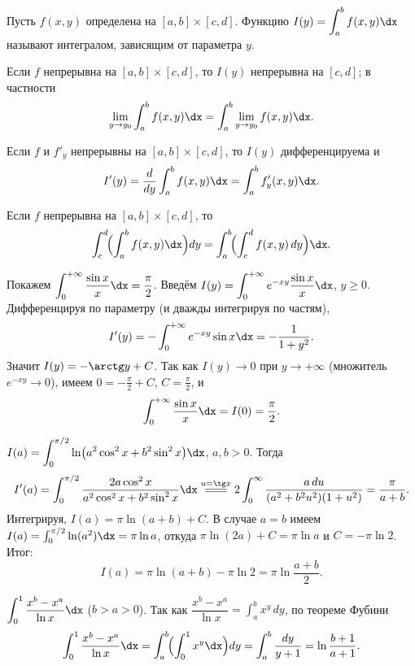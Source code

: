 \begin{definition}
Пусть $f(x,y)$ определена на $[a,b]\times[c,d]$. Функцию
$\displaystyle I(y)=\int_a^b f(x,y)\dx$ называют интегралом, зависящим от параметра $y$.
\end{definition}

\begin{theorem}[непрерывность]
Если $f$ непрерывна на $[a,b]\times[c,d]$, то $I(y)$ непрерывна на $[c,d]$; в частности
\[
  \lim_{y\to y_0}\int_a^b f(x,y)\dx=\int_a^b\lim_{y\to y_0}f(x,y)\dx .
\]
\end{theorem}

\begin{theorem}
Если $f$ и $f'_y$ непрерывны на $[a,b]\times[c,d]$, то $I(y)$ дифференцируема и
\[
  I'(y)=\frac{d}{dy}\int_a^b f(x,y)\dx=\int_a^b f'_y(x,y)\dx .
\]
\end{theorem}

\begin{theorem}
Если $f$ непрерывна на $[a,b]\times[c,d]$, то
\[
  \int_c^d\!\Bigl(\int_a^b f(x,y)\dx\Bigr)dy=\int_a^b\!\Bigl(\int_c^d f(x,y)\,dy\Bigr)\dx .
\]
\end{theorem}

\begin{example}
Покажем $\displaystyle\int_0^{+\infty}\frac{\sin x}{x}\dx=\frac\pi2$. Введём
$\displaystyle I(y)=\int_0^{+\infty}e^{-xy}\frac{\sin x}{x}\dx$, $y\ge0$. Дифференцируя по
параметру (и дважды интегрируя по частям),
\[
  I'(y)=-\int_0^{+\infty}e^{-xy}\sin x\dx=-\frac{1}{1+y^2}.
\]
Значит $I(y)=-\arctg y+C$. Так как $I(y)\to0$ при $y\to+\infty$ (множитель $e^{-xy}\to0$), имеем
$0=-\frac\pi2+C$, $C=\frac\pi2$, и
\[
  \int_0^{+\infty}\frac{\sin x}{x}\dx=I(0)=\frac\pi2 .
\]
\end{example}

\begin{example}
$\displaystyle I(a)=\int_0^{\pi/2}\ln\bigl(a^2\cos^2x+b^2\sin^2x\bigr)\dx$, $a,b>0$. Тогда
\[
  I'(a)=\int_0^{\pi/2}\frac{2a\cos^2x}{a^2\cos^2x+b^2\sin^2x}\dx
   \overset{u=\tg x}{=\!=\!=}2\int_0^{\infty}\frac{a\,du}{(a^2+b^2u^2)(1+u^2)}=\frac{\pi}{a+b}.
\]
Интегрируя, $I(a)=\pi\ln(a+b)+C$. В случае $a=b$ имеем
$I(a)=\int_0^{\pi/2}\ln(a^2)\dx=\pi\ln a$, откуда $\pi\ln(2a)+C=\pi\ln a$ и $C=-\pi\ln2$. Итог:
\[
  I(a)=\pi\ln(a+b)-\pi\ln2=\pi\ln\frac{a+b}{2}.
\]
\end{example}

\begin{example}
$\displaystyle\int_0^1\frac{x^b-x^a}{\ln x}\dx$ ($b>a>0$). Так как
$\dfrac{x^b-x^a}{\ln x}=\int_a^b x^y\,dy$, по теореме Фубини
\[
  \int_0^1\frac{x^b-x^a}{\ln x}\dx=\int_a^b\!\Bigl(\int_0^1 x^y\dx\Bigr)dy
   =\int_a^b\frac{dy}{y+1}=\ln\frac{b+1}{a+1}.
\]
\end{example}

